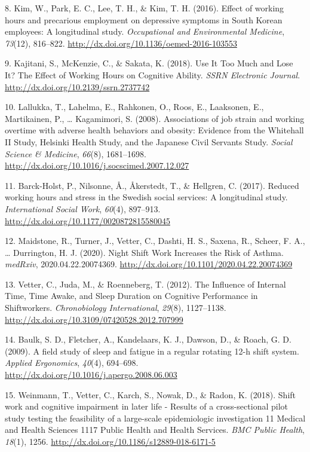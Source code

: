 \documentclass[]{article}
\begin{document}
\leavevmode\hypertarget{ref-Kim2016}{}%
8. Kim, W., Park, E. C., Lee, T. H., \& Kim, T. H. (2016). Effect of working hours and precarious employment on depressive symptoms in South Korean employees: A longitudinal study. \emph{Occupational and Environmental Medicine}, \emph{73}(12), 816--822. \url{http://dx.doi.org/10.1136/oemed-2016-103553}

\leavevmode\hypertarget{ref-Kajitani2018}{}%
9. Kajitani, S., McKenzie, C., \& Sakata, K. (2018). Use It Too Much and Lose It? The Effect of Working Hours on Cognitive Ability. \emph{SSRN Electronic Journal}. \url{http://dx.doi.org/10.2139/ssrn.2737742}

\leavevmode\hypertarget{ref-Lallukka2008}{}%
10. Lallukka, T., Lahelma, E., Rahkonen, O., Roos, E., Laaksonen, E., Martikainen, P., \ldots{} Kagamimori, S. (2008). Associations of job strain and working overtime with adverse health behaviors and obesity: Evidence from the Whitehall II Study, Helsinki Health Study, and the Japanese Civil Servants Study. \emph{Social Science \& Medicine}, \emph{66}(8), 1681--1698. \url{http://dx.doi.org/10.1016/j.socscimed.2007.12.027}

\leavevmode\hypertarget{ref-Barck-Holst2017}{}%
11. Barck-Holst, P., Nilsonne, Å., Åkerstedt, T., \& Hellgren, C. (2017). Reduced working hours and stress in the Swedish social services: A longitudinal study. \emph{International Social Work}, \emph{60}(4), 897--913. \url{http://dx.doi.org/10.1177/0020872815580045}

\leavevmode\hypertarget{ref-Maidstone2020}{}%
12. Maidstone, R., Turner, J., Vetter, C., Dashti, H. S., Saxena, R., Scheer, F. A., \ldots{} Durrington, H. J. (2020). Night Shift Work Increases the Risk of Asthma. \emph{medRxiv}, 2020.04.22.20074369. \url{http://dx.doi.org/10.1101/2020.04.22.20074369}

\leavevmode\hypertarget{ref-Vetter2012}{}%
13. Vetter, C., Juda, M., \& Roenneberg, T. (2012). The Influence of Internal Time, Time Awake, and Sleep Duration on Cognitive Performance in Shiftworkers. \emph{Chronobiology International}, \emph{29}(8), 1127--1138. \url{http://dx.doi.org/10.3109/07420528.2012.707999}

\leavevmode\hypertarget{ref-Baulk2009}{}%
14. Baulk, S. D., Fletcher, A., Kandelaars, K. J., Dawson, D., \& Roach, G. D. (2009). A field study of sleep and fatigue in a regular rotating 12-h shift system. \emph{Applied Ergonomics}, \emph{40}(4), 694--698. \url{http://dx.doi.org/10.1016/j.apergo.2008.06.003}

\leavevmode\hypertarget{ref-Weinmann2018}{}%
15. Weinmann, T., Vetter, C., Karch, S., Nowak, D., \& Radon, K. (2018). Shift work and cognitive impairment in later life - Results of a cross-sectional pilot study testing the feasibility of a large-scale epidemiologic investigation 11 Medical and Health Sciences 1117 Public Health and Health Services. \emph{BMC Public Health}, \emph{18}(1), 1256. \url{http://dx.doi.org/10.1186/s12889-018-6171-5}
\end{document}
